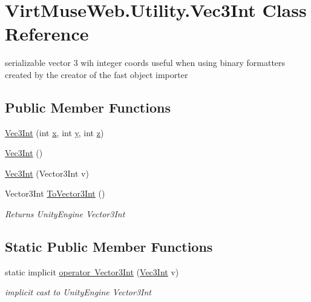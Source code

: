 \hypertarget{class_virt_muse_web_1_1_utility_1_1_vec3_int}{}\section{Virt\+Muse\+Web.\+Utility.\+Vec3\+Int Class Reference}
\label{class_virt_muse_web_1_1_utility_1_1_vec3_int}


serializable vector 3 wih integer coords useful when using binary formatters created by the creator of the fast object importer  


\subsection*{Public Member Functions}
\begin{DoxyCompactItemize}
\item 
\mbox{\hyperlink{class_virt_muse_web_1_1_utility_1_1_vec3_int_a620fcd4f2b087423da48dbce79de16c3}{Vec3\+Int}} (int \mbox{\hyperlink{class_virt_muse_web_1_1_utility_1_1_vec3_int_ad791a2661c4cada2c65b3e5843b7b95a}{x}}, int \mbox{\hyperlink{class_virt_muse_web_1_1_utility_1_1_vec3_int_a99269d662acd975060395ea79b5a673c}{y}}, int \mbox{\hyperlink{class_virt_muse_web_1_1_utility_1_1_vec3_int_a4e6192905bc3fc945ac608f334ef0475}{z}})
\item 
\mbox{\hyperlink{class_virt_muse_web_1_1_utility_1_1_vec3_int_a1c89cba03c2b4dc4049239fada67c509}{Vec3\+Int}} ()
\item 
\mbox{\hyperlink{class_virt_muse_web_1_1_utility_1_1_vec3_int_ab5e7f0bb6ac1c19ac8d62f49ad2acea4}{Vec3\+Int}} (Vector3\+Int v)
\item 
Vector3\+Int \mbox{\hyperlink{class_virt_muse_web_1_1_utility_1_1_vec3_int_a826b51cbef73c8623c7e060d3ae9c7f8}{To\+Vector3\+Int}} ()
\begin{DoxyCompactList}\small\item\em Returns Unity\+Engine Vector3\+Int \end{DoxyCompactList}\end{DoxyCompactItemize}
\subsection*{Static Public Member Functions}
\begin{DoxyCompactItemize}
\item 
static implicit \mbox{\hyperlink{class_virt_muse_web_1_1_utility_1_1_vec3_int_a2d02ca8e5970fa9d535b83c6aa18e71c}{operator Vector3\+Int}} (\mbox{\hyperlink{class_virt_muse_web_1_1_utility_1_1_vec3_int}{Vec3\+Int}} v)
\begin{DoxyCompactList}\small\item\em implicit cast to Unity\+Engine Vector3\+Int \end{DoxyCompactList}\end{DoxyCompactItemize}
